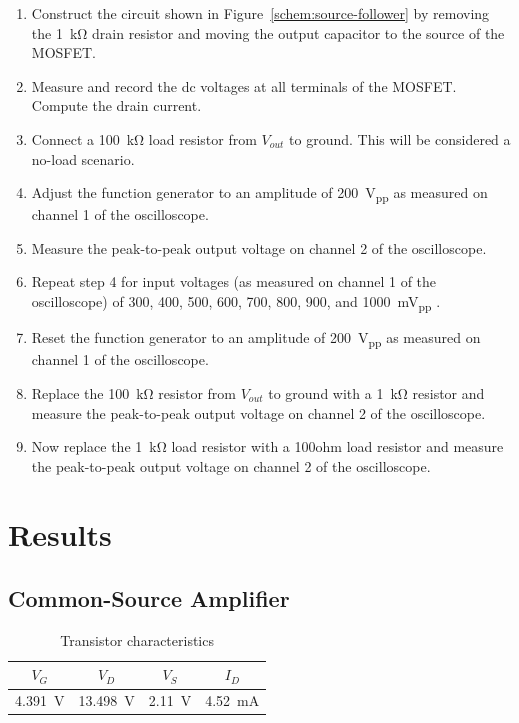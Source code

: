 \begin{enumerate}
\item Construct the circuit shown in Figure~\ref{schem:source-follower} by removing the \SI{1}{\kilo\ohm} drain resistor and moving the output capacitor to the source of the MOSFET.
\item Measure and record the dc voltages at all terminals of the MOSFET. Compute the drain current.
\item Connect a \SI{100}{\kilo\ohm} load resistor from $V_{out}$ to ground. This will be considered a no-load scenario.
\item Adjust the function generator to an amplitude of \SI{200}{V_{pp}} as measured on channel 1 of the oscilloscope.
\item Measure the peak-to-peak output voltage on channel 2 of the oscilloscope.
\item Repeat step 4 for input voltages (as measured on channel 1 of the oscilloscope) of 300, 400, 500, 600, 700, 800, 900, and \SI{1000}{mV_{pp}} .
\item Reset the function generator to an amplitude of \SI{200}{V_{pp}} as measured on channel 1 of the oscilloscope.
\item Replace the \SI{100}{\kilo\ohm} resistor from $V_{out}$ to ground with a \SI{1}{\kilo\ohm} resistor and measure the peak-to-peak output voltage on channel 2 of the oscilloscope.
\item Now replace the \SI{1}{\kilo\ohm} load resistor with a 100ohm load resistor and measure the peak-to-peak output voltage on channel 2 of the oscilloscope.
\end{enumerate}

\section{Results}

\subsection{Common-Source Amplifier}

\begin{table}[hbtp]
  \centering
  \begin{tabular}{cccc}
    $V_G$ & $V_D$ & $V_S$ & $I_D$ \\
    \hline
    \SI{4.391}{V} & \SI{13.498}{V} & \SI{2.11}{V} & \SI{4.52}{mA} \\
  \end{tabular}
  \caption{\label{tab:tran_common} Transistor characteristics}
\end{table}

